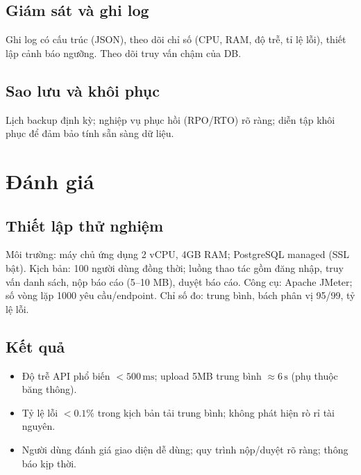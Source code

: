 \documentclass[conference]{IEEEtran}
\begin{document}
\subsection{Giám sát và ghi log}
Ghi log có cấu trúc (JSON), theo dõi chỉ số (CPU, RAM, độ trễ, tỉ lệ lỗi), thiết lập cảnh báo ngưỡng. Theo dõi truy vấn chậm của DB.

\subsection{Sao lưu và khôi phục}
Lịch backup định kỳ; nghiệp vụ phục hồi (RPO/RTO) rõ ràng; diễn tập khôi phục để đảm bảo tính sẵn sàng dữ liệu.

\section{Đánh giá}\label{sec:evaluation}
\subsection{Thiết lập thử nghiệm}
Môi trường: máy chủ ứng dụng 2 vCPU, 4GB RAM; PostgreSQL managed (SSL bật). Kịch bản: 100 người dùng đồng thời; luồng thao tác gồm đăng nhập, truy vấn danh sách, nộp báo cáo (5--10 MB), duyệt báo cáo. Công cụ: Apache JMeter; số vòng lặp 1000 yêu cầu/endpoint. Chỉ số đo: trung bình, bách phân vị 95/99, tỷ lệ lỗi.

\subsection{Kết quả}
\begin{itemize}
  \item Độ trễ API phổ biến $< 500\,\mathrm{ms}$; upload 5MB trung bình $\approx 6\,\mathrm{s}$ (phụ thuộc băng thông).
  \item Tỷ lệ lỗi $< 0.1\%$ trong kịch bản tải trung bình; không phát hiện rò rỉ tài nguyên.
  \item Người dùng đánh giá giao diện dễ dùng; quy trình nộp/duyệt rõ ràng; thông báo kịp thời.
\end{itemize}

\end{document}
